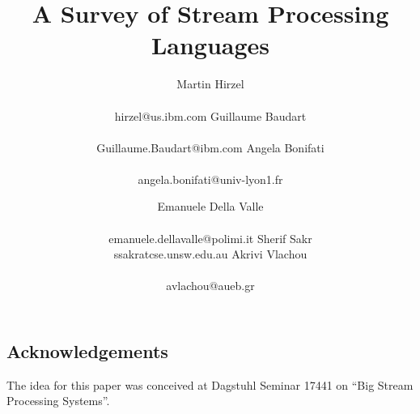 \documentclass[preprint]{sig-alternate-10pt}
\begin{document}
\title{A Survey of Stream Processing Languages}

\newcommand*{\emailn}[1]{\textsf{\normalsize #1}}

\author{
\alignauthor
Martin Hirzel\\
  \\
  \emailn{hirzel@us.ibm.com}
\alignauthor
Guillaume Baudart\\
  \\
  \emailn{Guillaume.Baudart@ibm.com}
\alignauthor
Angela Bonifati\\
  \\
  \emailn{angela.bonifati@univ-lyon1.fr}
\and
\alignauthor
Emanuele Della Valle\\
  \\
  \emailn{emanuele.dellavalle@polimi.it}
\alignauthor
Sherif Sakr\\
  \emailn{ssakratcse.unsw.edu.au}
\alignauthor
Akrivi Vlachou\\
  \\
  \emailn{avlachou@aueb.gr}}

\maketitle

\begin{abstract}
  
\end{abstract}






\subsection*{Acknowledgements}

The idea for this paper was conceived at Dagstuhl Seminar 17441 on
``Big Stream Processing Systems''.


\balance

\end{document}

